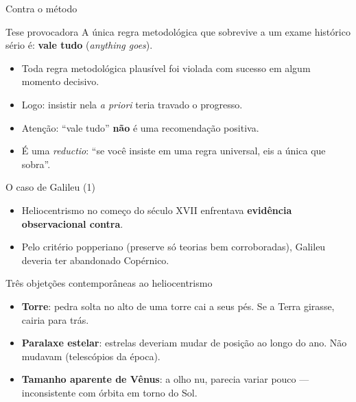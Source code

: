 \documentclass[aspectratio=169]{beamer}
\newcommand{\impt}[1]{\textcolor{maccent}{\textbf{#1}}}
\newcommand{\ntc}[1]{\textcolor{mprimary}{#1}}
\begin{document}
\begin{frame}{Contra o m\'etodo}
\begin{block}{Tese provocadora}
A \'unica regra metodol\'ogica que sobrevive a um exame hist\'orico s\'erio \'e: \impt{vale tudo} (\emph{anything goes}).
\end{block}
\vspace{0.3cm}
\begin{itemize}
    \item Toda regra metodol\'ogica plaus\'ivel foi violada com sucesso em algum momento decisivo.
    \item Logo: insistir nela \emph{a priori} teria \ntc{travado} o progresso.
\end{itemize}
\vspace{0.3cm}
\begin{itemize}
    \item Aten\c c\~ao: ``vale tudo'' \impt{n\~ao} \'e uma recomenda\c c\~ao positiva.
    \item \'E uma \emph{reductio}: ``se voc\^e insiste em uma regra universal, eis a \'unica que sobra''.
\end{itemize}
\end{frame}

\begin{frame}{O caso de Galileu (1)}
\begin{itemize}
    \item Heliocentrismo no come\c co do s\'eculo XVII enfrentava \impt{evid\^encia observacional contra}.
    \item Pelo crit\'erio popperiano (preserve s\'o teorias bem corroboradas), Galileu \ntc{deveria} ter abandonado Cop\'ernico.
\end{itemize}
\vspace{0.3cm}
\begin{block}{Tr\^es objet\c c\~oes contempor\^aneas ao heliocentrismo}
\begin{itemize}
    \item \impt{Torre}: pedra solta no alto de uma torre cai a seus p\'es. Se a Terra girasse, cairia para tr\'as.
    \item \impt{Paralaxe estelar}: estrelas deveriam mudar de posi\c c\~ao ao longo do ano. N\~ao mudavam (telesc\'opios da \'epoca).
    \item \impt{Tamanho aparente de V\^enus}: a olho nu, parecia variar pouco --- inconsistente com \'orbita em torno do Sol.
\end{itemize}
\end{block}
\end{frame}
\end{document}
